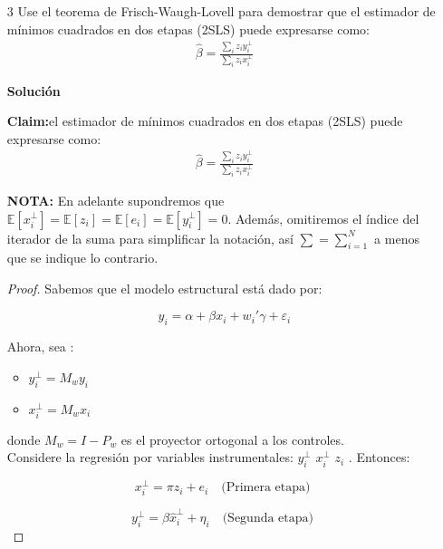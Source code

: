 \documentclass[a4paper, answers, addpoints, 11pt]{exam}
\newenvironment{solucion}{%
  \begin{mdframed}[
    backgroundcolor=blue!5,    %
    linecolor=blue!50,          %
    linewidth=2pt,              %
    leftmargin=10pt,            %
    rightmargin=8pt,           %
    topline=true,              %
    bottomline=true,            %
    roundcorner=10pt,           %
    innerleftmargin=10pt,       %
    innerrightmargin=10pt,      %
    innerbottommargin=10pt,     %
    innertopmargin=10pt         %
  ]%
  \begin{tcolorbox}[colframe=blue!50!black, colback=blue!50, coltitle=white, sharp corners=all, boxrule=1mm, width=\textwidth, halign=left, valign=center, top=0mm, bottom=0mm, left=0mm, right=0mm] \textbf{Solución} \end{tcolorbox} }{\end{mdframed}}
\begin{document}
\begin{enumerate}
    \item[3] Use el teorema de Frisch-Waugh-Lovell para demostrar que el estimador de mínimos cuadrados en dos etapas (2SLS) puede expresarse como:
    \begin{align}
    \hat{\beta} = \frac{\sum_{i} z_i y^{\perp}_{i}}{\sum_{i} z_i x^{\perp}_{i}} \label{eq:beta_fwl_IV}
    \end{align}

    \begin{solucion}
    \textbf{Claim:}el estimador de mínimos cuadrados en dos etapas (2SLS) puede expresarse como:
    \begin{align}
    \hat{\beta} = \frac{\sum_{i} z_i y^{\perp}_{i}}{\sum_{i} z_i x^{\perp}_{i}} \label{eq:beta_fwl_IV}
    \end{align}
    
    \textbf{NOTA:} En adelante supondremos que $\mathbb{E}[x_i^{\perp}] = \mathbb{E}[z_i] = \mathbb{E}[e_i] = \mathbb{E}[y_i^{\perp}] = 0$. Además, omitiremos el índice del iterador de la suma para simplificar la notación, así $\sum=\sum_{i=1}^N$ a menos que se indique lo contrario.
    
    \begin{proof}
    Sabemos que el modelo estructural está dado por:

\begin{equation*}\label{estructural}
    y_i = \alpha+ \beta x_i + w_i'\gamma + \varepsilon_i
\end{equation*}

Ahora, sea :
\begin{itemize}
    \item $ y_i^\perp = M_w y_i$ 
    \item  $x_i^\perp = M_w x_i$ 
\end{itemize}
donde \( M_w = I - P_w \) es el proyector ortogonal a los controles.\\
Considere la regresión  por variables instrumentales: $y_i^\perp$  $x_i^\perp$  $z_i$ . Entonces:

\begin{equation*}\label{primeraFWL}
    x_i^\perp = \pi z_i + e_i \quad \text{(Primera etapa) }
\end{equation*}

\begin{equation*}\label{segundaFWL}
    y_i^\perp = \beta \hat{x}_i^\perp + \eta_i \quad \text{(Segunda etapa) }
\end{equation*}


\end{proof}
\end{solucion}
\end{enumerate}
\end{document}
